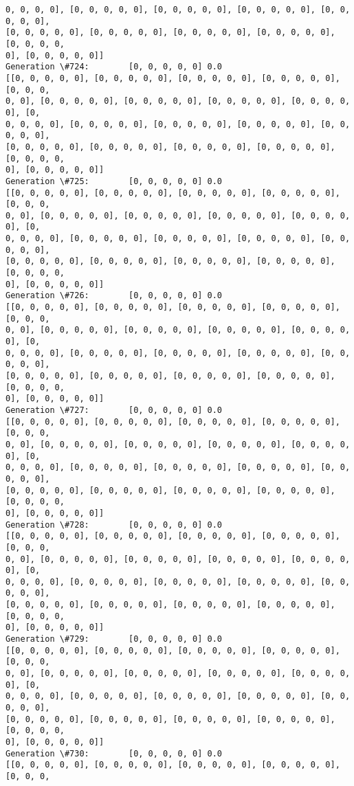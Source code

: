 \documentclass[11pt]{article}
\begin{document}
\begin{Verbatim}[commandchars=\\\{\}]
0, 0, 0, 0], [0, 0, 0, 0, 0], [0, 0, 0, 0, 0], [0, 0, 0, 0, 0], [0, 0, 0, 0, 0],
[0, 0, 0, 0, 0], [0, 0, 0, 0, 0], [0, 0, 0, 0, 0], [0, 0, 0, 0, 0], [0, 0, 0, 0,
0], [0, 0, 0, 0, 0]]
Generation \#724:        [0, 0, 0, 0, 0] 0.0
[[0, 0, 0, 0, 0], [0, 0, 0, 0, 0], [0, 0, 0, 0, 0], [0, 0, 0, 0, 0], [0, 0, 0,
0, 0], [0, 0, 0, 0, 0], [0, 0, 0, 0, 0], [0, 0, 0, 0, 0], [0, 0, 0, 0, 0], [0,
0, 0, 0, 0], [0, 0, 0, 0, 0], [0, 0, 0, 0, 0], [0, 0, 0, 0, 0], [0, 0, 0, 0, 0],
[0, 0, 0, 0, 0], [0, 0, 0, 0, 0], [0, 0, 0, 0, 0], [0, 0, 0, 0, 0], [0, 0, 0, 0,
0], [0, 0, 0, 0, 0]]
Generation \#725:        [0, 0, 0, 0, 0] 0.0
[[0, 0, 0, 0, 0], [0, 0, 0, 0, 0], [0, 0, 0, 0, 0], [0, 0, 0, 0, 0], [0, 0, 0,
0, 0], [0, 0, 0, 0, 0], [0, 0, 0, 0, 0], [0, 0, 0, 0, 0], [0, 0, 0, 0, 0], [0,
0, 0, 0, 0], [0, 0, 0, 0, 0], [0, 0, 0, 0, 0], [0, 0, 0, 0, 0], [0, 0, 0, 0, 0],
[0, 0, 0, 0, 0], [0, 0, 0, 0, 0], [0, 0, 0, 0, 0], [0, 0, 0, 0, 0], [0, 0, 0, 0,
0], [0, 0, 0, 0, 0]]
Generation \#726:        [0, 0, 0, 0, 0] 0.0
[[0, 0, 0, 0, 0], [0, 0, 0, 0, 0], [0, 0, 0, 0, 0], [0, 0, 0, 0, 0], [0, 0, 0,
0, 0], [0, 0, 0, 0, 0], [0, 0, 0, 0, 0], [0, 0, 0, 0, 0], [0, 0, 0, 0, 0], [0,
0, 0, 0, 0], [0, 0, 0, 0, 0], [0, 0, 0, 0, 0], [0, 0, 0, 0, 0], [0, 0, 0, 0, 0],
[0, 0, 0, 0, 0], [0, 0, 0, 0, 0], [0, 0, 0, 0, 0], [0, 0, 0, 0, 0], [0, 0, 0, 0,
0], [0, 0, 0, 0, 0]]
Generation \#727:        [0, 0, 0, 0, 0] 0.0
[[0, 0, 0, 0, 0], [0, 0, 0, 0, 0], [0, 0, 0, 0, 0], [0, 0, 0, 0, 0], [0, 0, 0,
0, 0], [0, 0, 0, 0, 0], [0, 0, 0, 0, 0], [0, 0, 0, 0, 0], [0, 0, 0, 0, 0], [0,
0, 0, 0, 0], [0, 0, 0, 0, 0], [0, 0, 0, 0, 0], [0, 0, 0, 0, 0], [0, 0, 0, 0, 0],
[0, 0, 0, 0, 0], [0, 0, 0, 0, 0], [0, 0, 0, 0, 0], [0, 0, 0, 0, 0], [0, 0, 0, 0,
0], [0, 0, 0, 0, 0]]
Generation \#728:        [0, 0, 0, 0, 0] 0.0
[[0, 0, 0, 0, 0], [0, 0, 0, 0, 0], [0, 0, 0, 0, 0], [0, 0, 0, 0, 0], [0, 0, 0,
0, 0], [0, 0, 0, 0, 0], [0, 0, 0, 0, 0], [0, 0, 0, 0, 0], [0, 0, 0, 0, 0], [0,
0, 0, 0, 0], [0, 0, 0, 0, 0], [0, 0, 0, 0, 0], [0, 0, 0, 0, 0], [0, 0, 0, 0, 0],
[0, 0, 0, 0, 0], [0, 0, 0, 0, 0], [0, 0, 0, 0, 0], [0, 0, 0, 0, 0], [0, 0, 0, 0,
0], [0, 0, 0, 0, 0]]
Generation \#729:        [0, 0, 0, 0, 0] 0.0
[[0, 0, 0, 0, 0], [0, 0, 0, 0, 0], [0, 0, 0, 0, 0], [0, 0, 0, 0, 0], [0, 0, 0,
0, 0], [0, 0, 0, 0, 0], [0, 0, 0, 0, 0], [0, 0, 0, 0, 0], [0, 0, 0, 0, 0], [0,
0, 0, 0, 0], [0, 0, 0, 0, 0], [0, 0, 0, 0, 0], [0, 0, 0, 0, 0], [0, 0, 0, 0, 0],
[0, 0, 0, 0, 0], [0, 0, 0, 0, 0], [0, 0, 0, 0, 0], [0, 0, 0, 0, 0], [0, 0, 0, 0,
0], [0, 0, 0, 0, 0]]
Generation \#730:        [0, 0, 0, 0, 0] 0.0
[[0, 0, 0, 0, 0], [0, 0, 0, 0, 0], [0, 0, 0, 0, 0], [0, 0, 0, 0, 0], [0, 0, 0,

\end{Verbatim}
\end{document}
